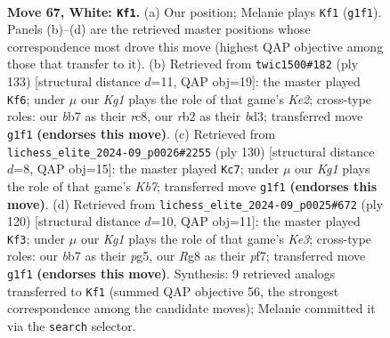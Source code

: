 \documentclass[11pt]{article}
\begin{document}
\clearpage

\begin{figure}[p]\centering
\begin{subfigure}{0.46\textwidth}\centering
\resizebox{\linewidth}{!}{%
\newchessgame
\chessboard[
  setfen={6R1/1b6/3k4/8/RP6/8/1r6/6K1 w - - 7 67},
  showmover=false,
  pgfstyle=straightmove, color=movearrow, markmove={g1-f1}
]}
\caption{}
\end{subfigure}\hfill
\begin{subfigure}{0.46\textwidth}\centering
\resizebox{\linewidth}{!}{%
\newchessgame
\chessboard[
  setfen={2R5/4k3/8/r4p2/8/3B1K2/8/8 b - - 21 67},
  showmover=false,
  pgfstyle=straightmove, color=movearrow, markmove={e7-f6}
]}
\caption{}
\end{subfigure}
\\[4pt]
\begin{subfigure}{0.46\textwidth}\centering
\resizebox{\linewidth}{!}{%
\newchessgame
\chessboard[
  setfen={8/1K6/5r2/8/3k4/1R3P2/8/8 w - - 3 66},
  showmover=false,
  pgfstyle=straightmove, color=movearrow, markmove={b7-c7}
]}
\caption{}
\end{subfigure}\hfill
\begin{subfigure}{0.46\textwidth}\centering
\resizebox{\linewidth}{!}{%
\newchessgame
\chessboard[
  setfen={8/5p2/8/4k1p1/r7/PR2K3/8/8 w - - 4 61},
  showmover=false,
  pgfstyle=straightmove, color=movearrow, markmove={e3-f3}
]}
\caption{}
\end{subfigure}
\caption{\textbf{Move 67, White: \texttt{Kf1}.} (a) Our position; Melanie plays \texttt{Kf1} (\texttt{g1f1}). Panels (b)--(d) are the retrieved master positions whose correspondence most drove this move (highest QAP objective among those that transfer to it). (b) Retrieved from \texttt{twic1500\#182} (ply 133) [structural distance $d$=11, QAP obj=19]: the master played \texttt{Kf6}; under $\mu$ our \emph{Kg1} plays the role of that game's \emph{Ke2}; cross-type roles: our \emph{b}b7 as their \emph{r}c8, our \emph{r}b2 as their \emph{b}d3; transferred move \texttt{g1f1} \textbf{(endorses this move)}. (c) Retrieved from \texttt{lichess\_elite\_2024-09\_p0026\#2255} (ply 130) [structural distance $d$=8, QAP obj=15]: the master played \texttt{Kc7}; under $\mu$ our \emph{Kg1} plays the role of that game's \emph{Kb7}; transferred move \texttt{g1f1} \textbf{(endorses this move)}. (d) Retrieved from \texttt{lichess\_elite\_2024-09\_p0025\#672} (ply 120) [structural distance $d$=10, QAP obj=11]: the master played \texttt{Kf3}; under $\mu$ our \emph{Kg1} plays the role of that game's \emph{Ke3}; cross-type roles: our \emph{b}b7 as their \emph{p}g5, our \emph{R}g8 as their \emph{p}f7; transferred move \texttt{g1f1} \textbf{(endorses this move)}. Synthesis: 9 retrieved analogs transferred to \texttt{Kf1} (summed QAP objective 56, the strongest correspondence among the candidate moves); Melanie committed it via the \texttt{search} selector.}
\label{fig:thought-m132}
\end{figure}
\end{document}
